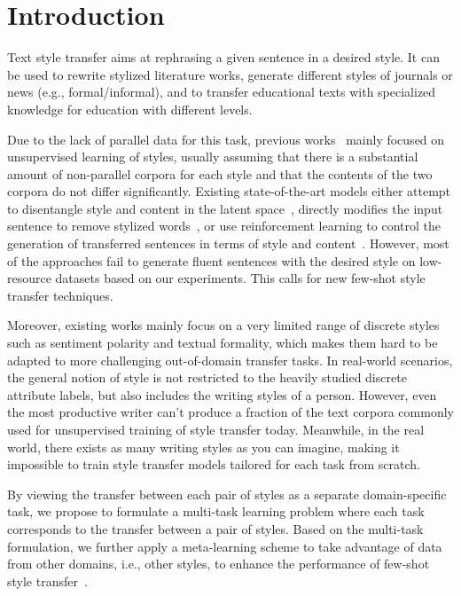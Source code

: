 \section{Introduction}
\label{sec:intro}

Text style transfer aims at rephrasing a given sentence in a desired style. It can be used to rewrite stylized literature works, generate different styles of journals or news (e.g., formal/informal), and to transfer educational texts with specialized knowledge for education with different levels.

Due to the lack of parallel data for this task, previous works~\citep{shen2017style,john2018disentangled,fu2018style} mainly focused on unsupervised learning of styles, usually assuming that there is a substantial amount of non-parallel corpora for each style and that the contents of the two corpora do not differ significantly. Existing state-of-the-art models either attempt to disentangle style and content in the latent space~\citep{shen2017style,john2018disentangled,fu2018style}, directly modifies the input sentence to remove stylized words~\citep{li2018delete}, or use reinforcement learning to control the generation of transferred sentences in terms of style and content~\citep{wu2019hierarchical,luo2019dual}. However, most of the approaches fail to generate fluent sentences with the desired style on low-resource datasets based on our experiments. This calls for new few-shot style transfer techniques. 


Moreover, existing works mainly focus on a very limited range of discrete styles such as sentiment polarity and textual formality, which makes them hard to be adapted to more challenging out-of-domain transfer tasks. In real-world scenarios, the general notion of style is not restricted to the heavily studied discrete attribute labels, but also includes the writing styles of a person. However, even the most productive writer can't produce a fraction of the text corpora commonly used for unsupervised training of style transfer today.
Meanwhile, in the real world, there exists as many writing styles as you can imagine, making it impossible to train style transfer models tailored for each task from scratch. 

By viewing the transfer between each pair of styles as a separate domain-specific task, we propose to formulate a multi-task learning problem where each task corresponds to the transfer between a pair of styles. Based on the multi-task formulation, we further apply a meta-learning scheme to take advantage of data from other domains, i.e., other styles, to enhance the performance of few-shot style transfer~\citep{finn2017model}.

